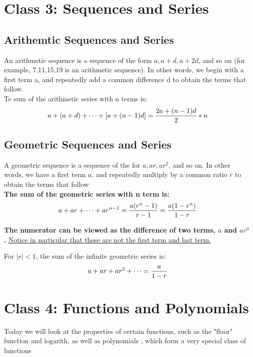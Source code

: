 \documentclass{article}
\begin{document}
\newpage
\section{Class 3: Sequences and Series}

\subsection{Arithemtic Sequences and Series}
An arithmetic sequence is a sequence of the form $a,a+d,a+2d$, and so on (for example, 7,11,15,19 is an arithmetic sequence).
In other words, we begin with a first term a, and repeatedly add a common difference d to obtain the terms that follow.
\\

Te sum of the arithmetic series with n terms is:
\begin{equation}
	a + (a + d) + \cdots + [a + (n - 1)d] = {{2a + (n - 1)d} \over 2} * n
\end{equation}

\subsection{Geometric Sequences and Series}

A geometric sequence is a sequence of the for $a, ar, ar^2$, and so on. 
In other words, we have a first term $a$, and repeatedly multiply by a common ratio $r$ to obtain the terms that follow
\\

\textbf{The sum of the geometric series with n term is: }
\begin{equation}
	a + ar + \cdots + ar^{n - 1} = {{a(r^n - 1)} \over r - 1} = {{a(1 - r^{n})} \over {1 - r}}
\end{equation}

\textbf{The numerator can be viewed as the difference of two terms, $a$ and $ar^n$.}
\underline{Notice in particular that these are not the first term and last term.}
\newline

For $|r| < 1$, the sum of the infinite geometric series is:
$$a + ar + ar^2 + \cdots = {a \over {1 - r}}$$ 
\newpage

\section{Class 4: Functions and Polynomials}
Today we will look at the properties of certain functions, such as the "floor" function and logarith, as well as polynomials
, which form a very special class of functions
\end{document}
